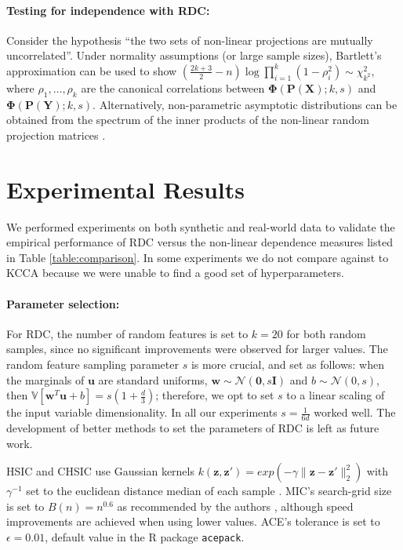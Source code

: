 \documentclass{article}
\newcommand{\augx}{\bm \Phi(\bm P(\bm X);k,s)}
\newcommand{\augy}{\bm \Phi(\bm P(\bm Y);k,s)}
\begin{document}
\paragraph{Testing for independence with RDC:} Consider the hypothesis ``the
two sets of non-linear projections are mutually uncorrelated''.  Under
normality assumptions (or large sample sizes), Bartlett's approximation
\cite{Mardia79} can be used to show
$
  \left(\frac{2k+3}{2}-n\right) \log \prod_{i=1}^k (1-\rho_i^2) \sim
  \chi^2_{k^2}
$,
where $\rho_1, \ldots, \rho_k$ are the canonical correlations between  $\augx$
and $\augy$. Alternatively, non-parametric asymptotic distributions can be
obtained from the spectrum of the inner products of the non-linear random
projection matrices \cite[Theorem 3]{Zhang12}.

\section{Experimental Results}\label{sec:exps}
We performed experiments on both synthetic and real-world data to validate the
empirical performance of RDC versus the non-linear dependence measures listed
in Table \ref{table:comparison}. In some experiments we do not compare against
to KCCA because we were unable to find a good set of hyperparameters.

\paragraph{Parameter selection:} For RDC, the number of random features is set
to $k=20$ for both random samples, since no significant improvements were
observed for larger values.  The random feature sampling parameter $s$ is more
crucial, and set as follows: when the marginals of $\bm u$ are standard
uniforms, $\bm w \sim \mathcal{N}(\bm 0, s \bm I)$ and $b \sim
\mathcal{N}(0,s)$, then $\mathbb{V}[\bm w^T \bm u + b] = s\left(1+\frac{d}{3}
\right)$; therefore, we opt to set $s$ to a linear scaling of the input
variable dimensionality.  In all our experiments $s = \frac{1}{6d}$ worked
well. The development of better methods to set the parameters of RDC is left as
future work.

HSIC and CHSIC use Gaussian kernels $k(\bm z, \bm z') = exp(-\gamma\| \bm z-
\bm z'\|_2^2)$ with $\gamma^{-1}$ set to the euclidean distance median of each
sample \cite{Gretton12}. MIC's search-grid size is set to $B(n) = n^{0.6}$ as
recommended by the authors \cite{Reshef11}, although speed improvements are
achieved when using lower values. ACE's tolerance is set to $\epsilon = 0.01$,
default value in the R package \texttt{acepack}.
\end{document}
